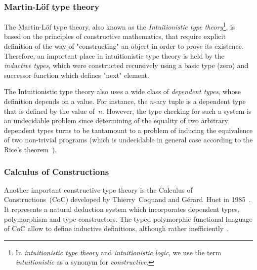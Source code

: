 \documentclass[article]{aaltoseries}
\begin{document}
\subsubsection{Martin-Löf type theory}
The Martin-Löf type theory, also known as the \textit{Intuitionistic type theory}\footnote{In \textit{intuitionistic type theory} and \textit{intuitionistic logic}, we use the term \textit{intuitionistic} as a synonym for \textit{constructive}.}, is based on the principles of constructive mathematics, that require explicit definition of the way of "constructing" an object in order to prove its existence. Therefore, an important place in intuitionistic type theory is held by the \textit{inductive types}, which were constructed recursively using a basic type (zero) and successor function which defines "next" element.

The Intuitionistic type theory also uses a wide class of \textit{dependent types}, whose definition depends on a value. For instance, the $n$-ary tuple is a dependent type that is defined by the value of~$n$. However, the type checking for such a system is an undecidable problem since determining of the equality of two arbitrary dependent types turns to be tantamount to a problem of inducing the equivalence of two non-trivial programs (which is undecidable in general case according to the Rice's theorem~\cite{Rice53}).



\subsubsection{Calculus of Constructions}

Another important constructive type theory is the Calculus of Constructions~(CoC) developed by Thierry~Coquand and Gérard~Huet in 1985~\cite{Coq85}. It represents a natural deduction system which incorporates dependent types, polymorphism and type constructors. The typed polymorphic functional language of CoC allow to define inductive definitions, although rather inefficiently~\cite{Paulin15}.
\end{document}
